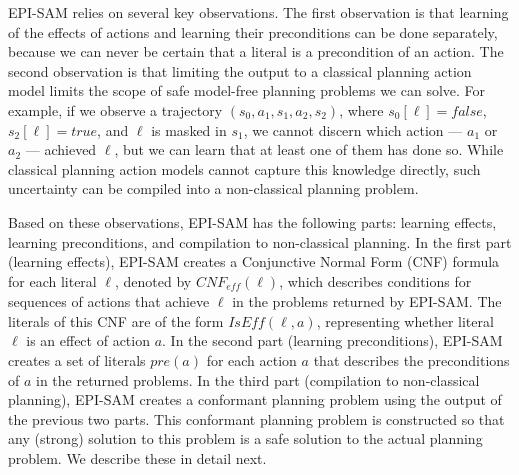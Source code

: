 \documentclass[letterpaper]{article} %
\newcommand{\pre}{\textit{pre}}
\newcommand{\eff}{\textit{eff}}
\newcommand{\cnf}{\textit{CNF}}
\newcommand{\true}{\textit{true}}
\newcommand{\false}{\textit{false}}
\newcommand{\iseff}{\textit{IsEff}}
\begin{document}
EPI-SAM relies on several key observations.
The first observation is that learning of the effects of actions and learning their preconditions can be done separately, because we can never be certain that a literal is a precondition of an action.
The second observation is that limiting the output to a classical planning action model limits the scope of safe model-free planning problems we can solve.
For example, if we observe a trajectory $(s_0,a_1,s_1,a_2,s_2)$, where $s_0[\ell]=\false$, $s_2[\ell]=\true$, and
 $\ell$ is masked in $s_1$, we cannot discern which action --- $a_1$ or $a_2$ --- achieved $\ell$, but we can learn that at least one of them has done so.
 While classical planning action models cannot capture this knowledge directly, such uncertainty can be compiled into a non-classical planning problem.







Based on these observations,  EPI-SAM has the following parts: learning effects, learning preconditions, and compilation to non-classical planning.
In the first part (learning effects), EPI-SAM creates a Conjunctive Normal Form (CNF) formula for each literal $\ell$, denoted by $\cnf_{\eff}(\ell)$, which describes conditions for
sequences of actions that achieve $\ell$ in the problems returned by EPI-SAM.
The literals of this CNF are of the form $\iseff(\ell,a)$, representing whether literal $\ell$ is an effect of action $a$.
In the second part (learning preconditions), EPI-SAM creates a set of literals $\pre(a)$ for each action $a$ that describes the preconditions of $a$ in the returned problems.
In the third part (compilation to non-classical planning), EPI-SAM creates a conformant planning problem using the output of the previous two parts. This conformant planning problem is constructed so that any (strong) solution to this problem is a safe solution to the actual planning problem.
We describe these in detail next.
\end{document}
